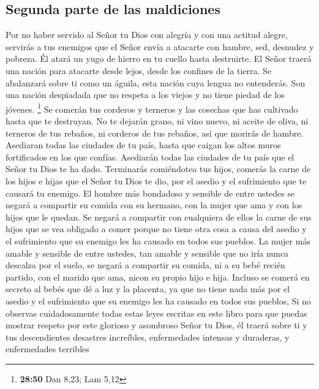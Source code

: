 \hypertarget{segunda-parte-de-las-maldiciones}{%
\subsection{Segunda parte de las
maldiciones}\label{segunda-parte-de-las-maldiciones}}

 Por no haber servido al Señor tu Dios con alegría y con
una actitud alegre,  servirás a tus enemigos que el Señor
envía a atacarte con hambre, sed, desnudez y pobreza. Él atará un yugo
de hierro en tu cuello hasta destruirte.  El Señor traerá
una nación para atacarte desde lejos, desde los confines de la tierra.
Se abalanzará sobre ti como un águila, esta nación cuya lengua no
entenderás.  Son una nación despiadada que no respeta a
los viejos y no tiene piedad de los jóvenes. \footnote{\textbf{28:50}
  Dan 8,23; Lam 5,12}  Se comerán tus corderos y terneros
y las cosechas que has cultivado hasta que te destruyan. No te dejarán
grano, ni vino nuevo, ni aceite de oliva, ni terneros de tus rebaños, ni
corderos de tus rebaños, así que morirás de hambre. 
Asediaran todas las ciudades de tu país, hasta que caigan los altos
muros fortificados en los que confías. Asediarán todas las ciudades de
tu país que el Señor tu Dios te ha dado.  Terminarás
comiéndotea tus hijos, comerás la carne de los hijos e hijas que el
Señor tu Dios te dio, por el asedio y el sufrimiento que te causará tu
enemigo.  El hombre más bondadoso y sensible de entre
ustedes se negará a compartir su comida con su hermano, con la mujer que
ama y con los hijos que le quedan.  Se negará a compartir
con cualquiera de ellos la carne de sus hijos que se vea obligado a
comer porque no tiene otra cosa a causa del asedio y el sufrimiento que
su enemigo les ha causado en todos sus pueblos.  La mujer
más amable y sensible de entre ustedes, tan amable y sensible que no
iría nunca descalza por el suelo, se negará a compartir su comida, ni a
su bebé recién partido, con el marido que ama, nicon su propio hijo e
hija.  Incluso se comerá en secreto al bebés que dé a luz
y la placenta, ya que no tiene nada más por el asedio y el sufrimiento
que su enemigo les ha causado en todos sus pueblos,  Si
no observas cuidadosamente todas estas leyes escritas en este libro para
que puedas mostrar respeto por este glorioso y asombroso Señor tu Dios,
 él traerá sobre ti y tus descendientes desastres
increíbles, enfermedades intensas y duraderas, y enfermedades terribles
